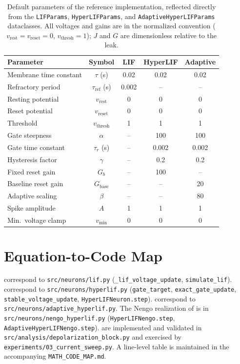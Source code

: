 \documentclass[journal]{IEEEtran}
\newcommand{\vth}{v_{\mathrm{thresh}}}
\newcommand{\vr}{v_{\mathrm{rest}}}
\newcommand{\vre}{v_{\mathrm{reset}}}
\newcommand{\vmin}{v_{\min}}
\newcommand{\Gb}{G_{b}}
\newcommand{\Gbase}{G_{\mathrm{base}}}
\newcommand{\code}[1]{\texttt{#1}}
\begin{document}
\begin{table}[t]
\centering
\caption{Default parameters of the reference implementation, reflected directly
from the \code{LIFParams}, \code{HyperLIFParams}, and
\code{AdaptiveHyperLIFParams} dataclasses. All voltages and gains are in the
normalized convention ($\vr=\vre=0$, $\vth=1$); $J$ and $G$ are dimensionless
relative to the leak.}
\label{tab:params}
\footnotesize
\begin{tabular}{@{}lcccc@{}}
\toprule
Parameter & Symbol & LIF & HyperLIF & Adaptive \\
\midrule
Membrane time constant & $\tau$ (s)             & 0.02  & 0.02  & 0.02 \\
Refractory period      & $\tau_{\mathrm{ref}}$ (s) & 0.002 & --    & --   \\
Resting potential      & $\vr$                  & 0     & 0     & 0    \\
Reset potential        & $\vre$                 & 0     & 0     & 0    \\
Threshold              & $\vth$                 & 1     & 1     & 1    \\
Gate steepness         & $\alpha$               & --    & 100   & 100  \\
Gate time constant     & $\tau_r$ (s)           & --    & 0.002 & 0.002 \\
Hysteresis factor      & $\gamma$               & --    & 0.2   & 0.2  \\
Fixed reset gain       & $\Gb$                  & --    & 100   & --   \\
Baseline reset gain    & $\Gbase$               & --    & --    & 20   \\
Adaptive scaling       & $\beta$                & --    & --    & 80   \\
Spike amplitude        & $A$                    & 1     & 1     & 1    \\
Min.\ voltage clamp    & $\vmin$                & 0     & 0     & 0    \\
\bottomrule
\end{tabular}
\end{table}

\section{Equation-to-Code Map}\label{app:map}
 correspond to \code{src/neurons/lif.py}
(\code{\_lif\_voltage\_update}, \code{simulate\_lif}).
 correspond to \code{src/neurons/hyperlif.py}
(\code{gate\_target}, \code{exact\_gate\_update}, \code{stable\_voltage\_update},
\code{HyperLIFNeuron.step}).
 correspond to
\code{src/neurons/adaptive\_hyperlif.py}.
The Nengo realization of  is in
\code{src/neurons/nengo\_hyperlif.py} (\code{HyperLIFNengo.step},
\code{AdaptiveHyperLIFNengo.step}).
 are implemented and validated in
\code{src/analysis/depolarization\_block.py} and exercised by
\code{experiments/03\_current\_sweep.py}. A line-level table is maintained in
the accompanying \code{MATH\_CODE\_MAP.md}.
\end{document}
